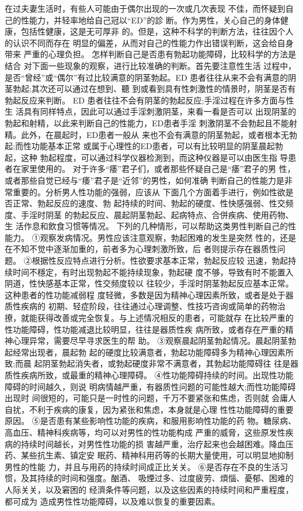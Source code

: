 \documentclass[12pt,UTF8]{ctexbook}
\begin{document}
在过夫妻生活时，有些人可能由于偶尔出现的一次或几次表现
不佳，而怀疑到自己的性能力，并轻率地给自己冠以“ED”的診
断。作为男性，关心自己的身体健康，包括性健康，这是无可厚非
的。但是，这种不科学的判断方法，往往因个人的认识不同而存在
明显的偏差，从而对自己的性能力作出错误判断，这会给自身带来
严重的心理负担。
怎样判断自己是否患有勃起功能障碍，比较科学的方法是结合
对下面一些现象的观察，进行比较准确的判断。首先要注意性生活
过程中，是否“曾经”或“偶尔”有过比较满意的阴茎勃起。ED
患者往往从来不会有满意的阴茎勃起;其次还可以通过在想到、聽
到或看到具有性刺激性的情景时，阴茎是否有勃起反应来判断。
ED 患者往往不会有阴茎的勃起反应;手淫过程在许多方面与性生
活具有同样特点，因此可以通过手淫刺激阴茎，来看一看是否可以
出现阴茎的勃起和射精，以此来判断自己的性能力，ED患者手淫
刺激阴茎不会勃起且不能射精。此外，在晨起时，ED患者一般从
来也不会有满意的阴茎勃起，或者根本无勃起;而性功能基本正常
或属于心理性的ED患者，可以有比较明显的阴茎晨起勃起，这种
勃起程度，可以通过科学仪器检測到，而这种仪器是可以由医生指
导患者在家里使用的。
对于许多“痿”君子们，或者那些怀疑自己是“痿”君子的男
性，或者那些自觉已经与“痿”君子是“近邻”的男性，如何准确
判断自己的性能力是非常重要的。分析男人性功能的强弱，应该从
下面几个方面着手进行，例如性欲是否正常、勃起反应的速度、勃
起持续的时间、勃起的硬度、性快感强弱、性交频度、手淫时阴茎
的勃起反应、晨起阴茎勃起、起病特点、合併疾病、使用药物、生
活作息和飲食习惯等情况。
下列的几种情形，可以帮助这类男性判断自己的性能力。
①观察发病情况。男性应该注意观察，勃起困难的发生是突然
性的，还是在不知不觉中逐渐加重的，前者多为心理刺激所致，后
者则提示存在器质性问题。
②根据性反应特点进行分析。性欲要求基本正常，勃起反应较
迅速，勃起持续时间不穩定，有时出现勃起不能持续现象，勃起硬
度不够，导致有时不能置入阴道，性快感基本正常，性交频度较以
往较少，手淫时阴茎勃起反应基本正常。这种患者的性功能减弱程
度轻微，多数是因为精神心理因素所致，或者是处于器质性疾病的
初期、轻症阶段，往往通过心理调整、性技巧咨询或简单的药物治
撩，就能获得改善或完全恢复。与上述情况相反的患者，可能就存
在比较严重的性功能障碍，性功能减退比较明显，往往是器质性疾
病所致，或者存在严重的精神心理异常，需要尽早寻求医生的帮
助。
③观察晨起阴茎勃起情况。晨起阴茎勃起经常出现者，晨起勃
起的硬度比较满意者，勃起功能障碍多为精神心理因素所致;而晨
起阴茎勃起消失者，或勃起硬度非常不满意者，其勃起功能障碍往
往是器质性疾病所致，或最重的精神心理障碍。
④性功能障碍持续的时间。出现性功能障碍的时间越久，则说
明病情越严重，有器质性问题的可能性越大;而性功能障碍出现时
间很短的，可能只是一时性的问题，千万不要紧张和焦虑，否则就
会庸人自扰，不利于疾病的康复，因为紧张和焦虑，本身就是心理
性性功能障碍的重要原因。
⑤是否患有某些影响性功能的疾病，和服用影响性功能的药
物。糖尿病、高血压、精神科疾病等，均可以对男性的性功能构成
严重的威脅，这些原发性疾病的持续时间越长，对男性性功能的损
害越严重，治疗起来也会越困难。降血压药、某些抗生素、镇定安
眠药、精神科用药等的长期大量使用，可以明显地抑制男性的性能
力，并且与用药的持续时间成正比关关。
⑥是否存在不良的生活习惯，及其持续的时间和强度。酗酒、
吸煙过多、过度疲劳、煩惱、憂郁、困难的人际关关，以及窘困的
经濟条件等问题，以及这些因素的持续时间和严重程度，都可成为
造成男性性功能障碍，以及难以恢复的重要因素。
\end{document}
